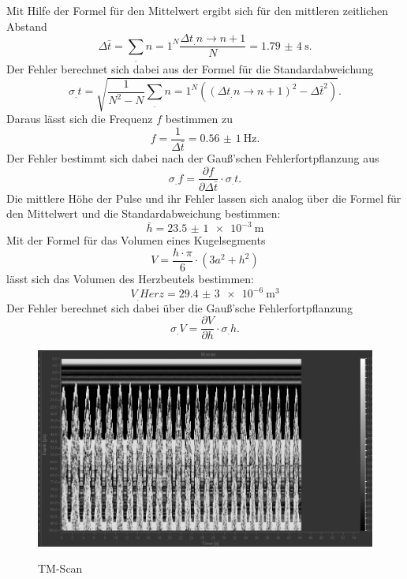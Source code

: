 \noindent Mit Hilfe der Formel für den Mittelwert ergibt sich für den mittleren zeitlichen Abstand
\[
\Delta\bar{t}= \sum_.{n=1}^N \frac{\Delta t_.{n\rightarrow n+1}}{N} = \SI{1,79(4)}{\second} \text{.}
\]
Der Fehler berechnet sich dabei aus der Formel für die Standardabweichung
\[
\sigma_.t=\sqrt{\frac{1}{N^2-N}\sum_.n=1^N ((\Delta t_.{n\rightarrow n+1})^2-\Delta\bar{t}^2)} \text{.}
\]
Daraus lässt sich die Frequenz $f$ bestimmen zu
\[
f=\frac{1}{\Delta\bar{t}}= \SI{0,56(1)}{\hertz} \text{.}
\]
Der Fehler bestimmt sich dabei nach der Gauß'schen Fehlerfortpflanzung aus
\[
\sigma_.f=\frac{\partial f}{\partial \Delta\bar{t}}\cdot \sigma_.t \text{.}
\]
Die mittlere Höhe der Pulse und ihr Fehler lassen sich analog über die Formel für den Mittelwert und die Standardabweichung bestimmen:
\[
\bar{h}=\SI{23,5(1)e-3}{\metre}
\]
Mit der Formel für das Volumen eines Kugelsegments
\[
V=\frac{h\cdot\pi}{6}\cdot\left(3a^2+h^2\right)
\]
lässt sich das Volumen des Herzbeutels bestimmen:
\[
V_.{Herz}=\SI{29,4(3)e-6}{\cubic\metre}
\]
Der Fehler berechnet sich dabei über die Gauß'sche Fehlerfortpflanzung
\[
\sigma_.V=\frac{\partial V}{\partial h}\cdot\sigma_.h \text{.}
\]
\begin{figure}
	\centering
	\caption{TM-Scan}
	\includegraphics[width=\linewidth-40pt,height=\textheight-40pt,keepaspectratio]{content/images/TM-Scan.jpg}
	\label{fig:TM-Scan}
\end{figure}
